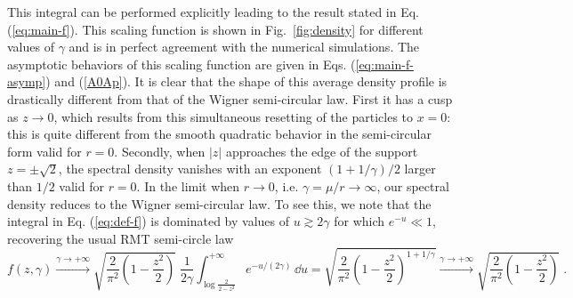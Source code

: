 \documentclass[onecolumn,superscriptaddress,
 amsmath,amssymb,
 aps,
 prd,
]{revtex4-1}
\begin{document}
{This integral can be performed explicitly leading to the result stated in Eq. (\ref{eq:main-f}). This scaling function is shown in Fig.~\ref{fig:density} for different values of $\gamma$ and is in perfect agreement with the numerical simulations. The asymptotic behaviors of this scaling function are given in Eqs. (\ref{eq:main-f-asymp}) and (\ref{A0Ap}). It is clear that the shape of this average density profile is drastically different from that of the Wigner semi-circular law. First it has a cusp as $z \to 0$, which results from this simultaneous resetting of the particles to $x=0$: this is quite different from the smooth quadratic behavior in the semi-circular form valid for $r=0$. Secondly, when $|z|$ approaches the edge of the support $z = \pm \sqrt{2}$, the spectral density vanishes with an exponent $(1+1/\gamma)/2$ larger than $1/2$ valid for $r=0$. In the limit when $r \to 0$, i.e. $\gamma = \mu/r \to \infty$, our spectral density reduces to the Wigner semi-circular law. To see this, we note that the integral in Eq. (\ref{eq:def-f}) is dominated by values of $u \gtrsim 2 \gamma$ for which $e^{-u} \ll 1$, recovering the usual RMT semi-circle law
\begin{equation} \label{eq:f-inf}
f(z, \gamma) \stackrel{\gamma \to +\infty}{\longrightarrow} \sqrt{\frac{2}{\pi^2}\left( 1 - \frac{z^2}{2}\right)}\; \frac{1}{2 \gamma} \int_{\log \frac{2}{2 - z^2}}^{+\infty} e^{-u/(2 \gamma)} \, \dd u = \sqrt{\frac{2}{\pi^2}\left( 1 - \frac{z^2}{2}\right)^{1 + 1/\gamma}} \stackrel{\gamma \to +\infty}{\longrightarrow} \sqrt{\frac{2}{\pi^2}\left( 1 - \frac{z^2}{2}\right)} \;.
\end{equation}



}
\end{document}
